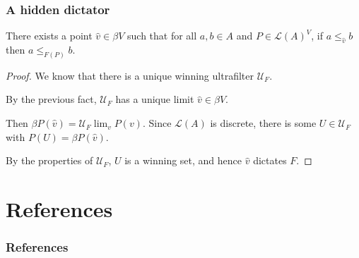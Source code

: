 \documentclass{beamer}
\theoremstyle{definition}
\begin{document}
\begin{frame}
    \frametitle{A hidden dictator}

    \begin{theorem}
        There exists a point $\hat{v} \in \mathit{\beta V}$ such that for all $a, b \in A$ and $P \in \mathcal{L}(A)^V$, if $a \leq_{\hat{v}} b$
        then $a \leq_{F(P)} b$.
    \end{theorem}

    \begin{proof}
        \pause
        We know that there is a unique winning ultrafilter $\mathcal{U}_F$.

        \pause
        By the previous fact, $\mathcal{U}_F$ has a unique limit $\hat{v} \in \mathit{\beta V}$.
        
        \pause
        Then $\mathit{\beta P}(\hat{v}) = \mathcal{U}_F\lim_v P(v)$. Since $\mathcal{L}(A)$ is discrete, there is some
        $U \in \mathcal{U}_F$ with $P(U) = \mathit{\beta P}(\hat{v})$.
        
        \pause
        By the properties of $\mathcal{U}_F$, $U$ is a winning set, and hence $\hat{v}$ dictates $F$.
    \end{proof}

\end{frame}

\section{References}

\begin{frame}
    \frametitle{References}

    \nocite{*}
    \printbibliography

\end{frame}
\end{document}
